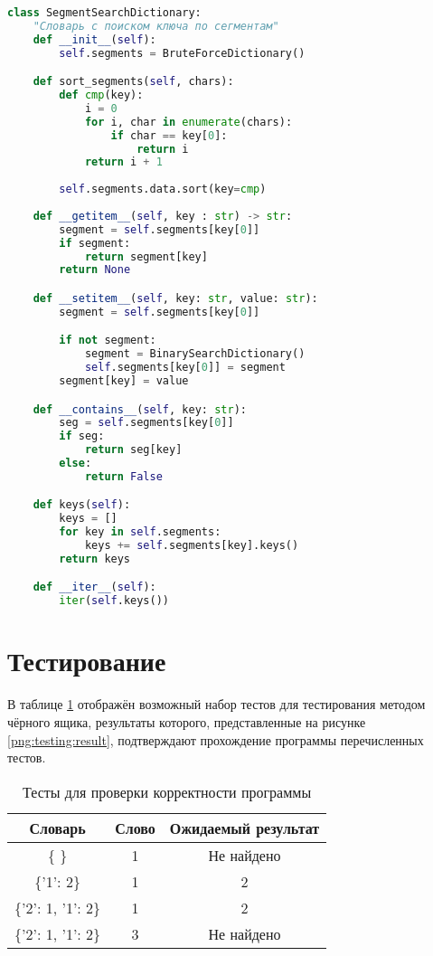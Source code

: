         \begin{lstlisting}[language=python, label=lst:segment, caption=Реализация алгоритма поиска слова в словаре по сегментам]
class SegmentSearchDictionary:
    "Словарь с поиском ключа по сегментам"
    def __init__(self):
        self.segments = BruteForceDictionary()

    def sort_segments(self, chars):
        def cmp(key):
            i = 0
            for i, char in enumerate(chars):
                if char == key[0]:
                    return i
            return i + 1
            
        self.segments.data.sort(key=cmp)
    
    def __getitem__(self, key : str) -> str:
        segment = self.segments[key[0]]
        if segment:
            return segment[key]
        return None

    def __setitem__(self, key: str, value: str):
        segment = self.segments[key[0]]

        if not segment:
            segment = BinarySearchDictionary()
            self.segments[key[0]] = segment
        segment[key] = value

    def __contains__(self, key: str):
        seg = self.segments[key[0]]
        if seg:
            return seg[key]
        else:
            return False

    def keys(self):
        keys = []
        for key in self.segments:
            keys += self.segments[key].keys()
        return keys

    def __iter__(self):
        iter(self.keys())
        \end{lstlisting}
    
        
    \section{Тестирование}
        В таблице \ref{table:testing} отображён возможный набор тестов
        для тестирования методом чёрного ящика, результаты которого, 
        представленные на рисунке \ref{png:testing:result}, подтверждают
        прохождение программы перечисленных тестов.

        \begin{table}[]
            \caption{Тесты для проверки корректности программы}

            \centering
            \begin{tabular}{|c|c|c|}
                \hline
                Словарь                     & Слово  & Ожидаемый результат  \\ \hline
                  \{ \}                       &  1     &    Не найдено        \\ \hline
                \{'1': 2\}                    &  1     &        2             \\ \hline
                \{'2': 1, '1': 2\}            &  1     &        2             \\ \hline
                \{'2': 1, '1': 2\}            &  3     &    Не найдено        \\ \hline
                \end{tabular}
            \label{table:testing}
        \end{table}
        
